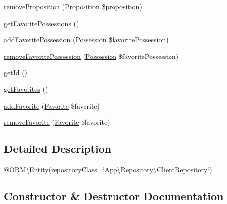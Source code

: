 \begin{DoxyCompactItemize}
\item 
\mbox{\hyperlink{class_app_1_1_entity_1_1_client_a58c62b937fc2658f35588927927601f5}{remove\+Proposition}} (\mbox{\hyperlink{class_app_1_1_entity_1_1_proposition}{Proposition}} \$proposition)
\item 
\mbox{\hyperlink{class_app_1_1_entity_1_1_client_acdb317199da967d0426a4842d500430a}{get\+Favorite\+Possessions}} ()
\item 
\mbox{\hyperlink{class_app_1_1_entity_1_1_client_a6dc717b2e3750bd9862e760f036333cb}{add\+Favorite\+Possession}} (\mbox{\hyperlink{class_app_1_1_entity_1_1_possession}{Possession}} \$favorite\+Possession)
\item 
\mbox{\hyperlink{class_app_1_1_entity_1_1_client_aa5aecc4a8c2b86f04959da66fd968642}{remove\+Favorite\+Possession}} (\mbox{\hyperlink{class_app_1_1_entity_1_1_possession}{Possession}} \$favorite\+Possession)
\item 
\mbox{\hyperlink{class_app_1_1_entity_1_1_client_a12251d0c022e9e21c137a105ff683f13}{get\+Id}} ()
\item 
\mbox{\hyperlink{class_app_1_1_entity_1_1_client_a645f4955cea1e0f521355b8128dad326}{get\+Favorites}} ()
\item 
\mbox{\hyperlink{class_app_1_1_entity_1_1_client_a615e5ec7b500b8e4ccfb8a2c32d9f8e8}{add\+Favorite}} (\mbox{\hyperlink{class_app_1_1_entity_1_1_favorite}{Favorite}} \$favorite)
\item 
\mbox{\hyperlink{class_app_1_1_entity_1_1_client_af7ddb0058fa8b93c95254b1435a34f27}{remove\+Favorite}} (\mbox{\hyperlink{class_app_1_1_entity_1_1_favorite}{Favorite}} \$favorite)
\end{DoxyCompactItemize}


\subsection{Detailed Description}
@\+O\+RM\textbackslash{}\+Entity(repository\+Class=\char`\"{}\+App\textbackslash{}\+Repository\textbackslash{}\+Client\+Repository\char`\"{}) 

\subsection{Constructor \& Destructor Documentation}
\mbox{\label{class_app_1_1_entity_1_1_client_a095c5d389db211932136b53f25f39685}} 
